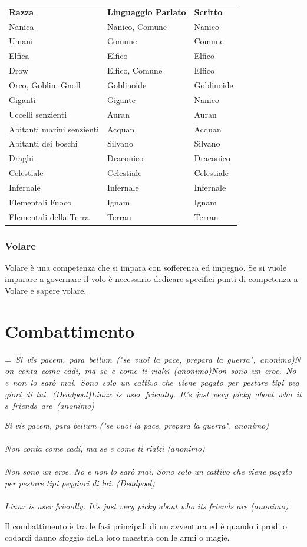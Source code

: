 \documentclass[a4paper,11pt,twoside,openany]{book}
\makeatletter
\newcommand{\mybox}[1]{%
	\setbox0=\hbox{#1}%
	\setlength{\@tempdima}{\dimexpr\wd0+13pt}%
	\begin{tcolorbox}[boxrule=0.5pt,arc=4pt, breakable,enhanced,
		left=6pt,right=6pt,top=6pt,bottom=6pt,boxsep=0pt,width=\@tempdima]
		#1
	\end{tcolorbox}
}
\makeatother
\begin{document}
\begin{tabular}{lll}
\toprule
\textbf{Razza} & \textbf{Linguaggio Parlato}& \textbf{Scritto}\tabularnewline
Nanica & Nanico, Comune & Nanico\tabularnewline
Umani & Comune & Comune\tabularnewline
Elfica & Elfico & Elfico\tabularnewline
Drow & Elfico, Comune & Elfico\tabularnewline
Orco, Goblin. Gnoll & Goblinoide & Goblinoide\tabularnewline
Giganti & Gigante & Nanico\tabularnewline
Uccelli senzienti & Auran & Auran\tabularnewline
Abitanti marini senzienti & Acquan & Acquan\tabularnewline
Abitanti dei boschi & Silvano & Silvano\tabularnewline
Draghi & Draconico & Draconico\tabularnewline
Celestiale & Celestiale & Celestiale\tabularnewline
Infernale & Infernale & Infernale\tabularnewline
Elementali Fuoco & Ignam & Ignam\tabularnewline
Elementali della Terra & Terran & Terran\tabularnewline

\end{tabular}

\subsubsection{Volare}

\label{volare}

Volare è una competenza che si impara con sofferenza ed impegno. Se si vuole imparare a governare il volo è necessario dedicare specifici punti di competenza a Volare e sapere volare.

\pagebreak

\section{Combattimento}

\label{combattimento}
\mybox{\textit{
Si vis pacem, para bellum ("se vuoi la pace, prepara la guerra", anonimo)\\\\
Non conta come cadi, ma se e come ti rialzi (anonimo)\\\\
Non sono un eroe. No e non lo sarò mai. Sono solo un cattivo che viene pagato per pestare tipi peggiori di lui. (Deadpool)\\\\
Linux is user friendly. It's just very picky about who its friends are (anonimo)
}}\medskip

Il combattimento è tra le fasi principali di un avventura ed è quando i prodi o codardi danno sfoggio della loro maestria con le armi o magie.
\end{document}
